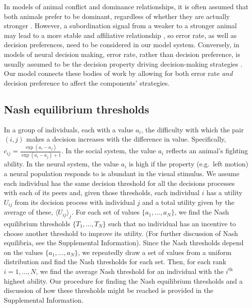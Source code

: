 \documentclass{pnastwo}
\begin{document}
\begin{article}
In models of animal conflict and dominance relationships, it is often assumed that both animals prefer to be dominant, regardless of whether they are actually stronger \cite{Froment:2010fk, Hemelrijk:2011fk}. However, a subordination signal from a weaker to a stronger animal may lead to a more stable and affiliative relationship \cite{Flack:2007kx}, so error rate, as well as decision preferences, need to be considered in our model system. Conversely, in models of neural decision making, error rate, rather than decision preference, is usually assumed to be the decision property driving decision-making strategies \cite{Bogacz:2006uq}. Our model connects these bodies of work by allowing for both error rate \emph{and} decision preference to affect the components' strategies. 


\subsection{Nash equilibrium thresholds}
In a group of individuals, each with a value $a_i$, the difficulty with which the pair $(i,j)$ makes a decision increases with the difference in value. Specifically, $c_{ij}=\frac{\exp(a_i-a_j)}{\exp(a_i-a_j)+1}$. In the social system, the value $a_i$ reflects an animal's fighting ability.  In the neural system, the value $a_i$ is high if the property (e.g.\ left motion) a neural population responds to is abundant in the visual stimulus. We assume each individual has the same decision threshold for all the decisions processes with each of its peers and, given those thresholds, each individual $i$ has a utility $U_{ij}$ from its decision process with individual $j$ and a total utility given by the average of these, $\langle U_{ij}\rangle _j$. For each set of values $\{a_1,\dots,a_N\}$, we find the Nash equilibrium thresholds $\{T_1,\dots,T_N\}$ such that no individual has an incentive to choose another threshold to improve its utility.  (For further discussion of Nash equilibria, see the Supplemental Information). Since the Nash thresholds depend on the values $\{a_1,\dots,a_N\}$,  we repeatedly draw a set of values from a uniform distribution and find the Nash thresholds for each set. Then, for each rank $i=1,\dots,N$, we find the average Nash threshold for an individual with the $i^{\text{th}}$ highest ability.   Our procedure for finding the Nash equilibrium thresholds and a discussion of how these thresholds might be reached is provided in the Supplemental Information.


\end{article}
\end{document}
